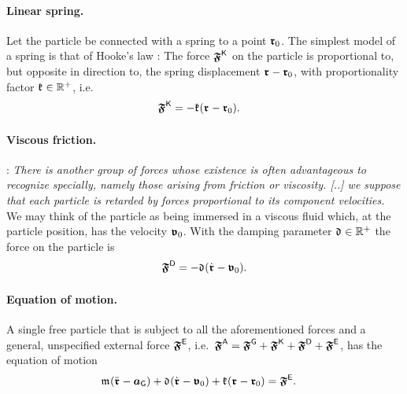 \paragraph{Linear spring.}
Let the particle be connected with a spring to a point $\boldsymbol{\mathfrak{r}}_{0}$.
The simplest model of a spring is that of Hooke's law \cite{Hooke:OfSprings}: The force $\boldsymbol{\mathfrak{F}}_{}^{\mathsf{K}}$ on the particle is proportional to, but opposite in direction to, the spring displacement $\boldsymbol{\mathfrak{r}}_{} - \boldsymbol{\mathfrak{r}}_{0}$, with proportionality factor $\mathfrak{k}_{} \in \mathbb{R}^+$, i.e.\
\begin{align}\label{eq:ParticleStiffness}
 \boldsymbol{\mathfrak{F}}_{}^{\mathsf{K}} &= -\mathfrak{k}_{} (\boldsymbol{\mathfrak{r}}_{} - \boldsymbol{\mathfrak{r}}_{0})
 .
\end{align}

\paragraph{Viscous friction.}
\cite[§81]{Rayleigh:TheoryOfSound}: \textit{There is another group of forces whose existence is often advantageous to recognize specially, namely those arising from friction or viscosity. [..] we suppose that each particle is retarded by forces proportional to its component velocities.}
We may think of the particle as being immersed in a viscous fluid which, at the particle position, has the velocity $\boldsymbol{\mathfrak{v}}_0$.
With the damping parameter $\mathfrak{d}_{} \in \mathbb{R}^+$ the force on the particle is
\begin{align}\label{eq:ParticleDamping}
 \boldsymbol{\mathfrak{F}}_{}^{\mathsf{D}} = -\mathfrak{d}_{} (\dot{\boldsymbol{\mathfrak{r}}}_{} - \boldsymbol{\mathfrak{v}}_0)
 .
\end{align}


\paragraph{Equation of motion.}
A single free particle that is subject to all the aforementioned forces and a general, unspecified external force $\boldsymbol{\mathfrak{F}}_{}^{\mathsf{E}}$, i.e.\ $\boldsymbol{\mathfrak{F}}_{}^{\mathsf{A}} = \boldsymbol{\mathfrak{F}}_{}^{\mathsf{G}} + \boldsymbol{\mathfrak{F}}_{}^{\mathsf{K}} + \boldsymbol{\mathfrak{F}}_{}^{\mathsf{D}} + \boldsymbol{\mathfrak{F}}_{}^{\mathsf{E}}$, has the equation of motion 
\begin{align}\label{eq:ParticleEoM}
 \mathfrak{m}_{} (\ddot{\boldsymbol{\mathfrak{r}}}_{} - \boldsymbol{a}_{\mathsf{G}}) + \mathfrak{d}_{} (\dot{\boldsymbol{\mathfrak{r}}}_{} - \boldsymbol{\mathfrak{v}}_0) + \mathfrak{k}_{} (\boldsymbol{\mathfrak{r}}_{} - \boldsymbol{\mathfrak{r}}_{0}) &= \boldsymbol{\mathfrak{F}}_{}^{\mathsf{E}}.
\end{align}

